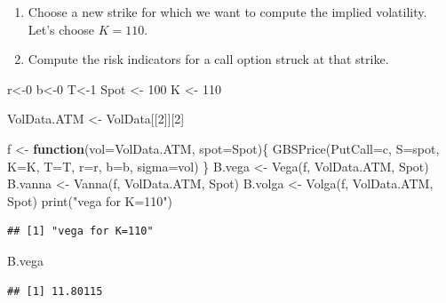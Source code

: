 \documentclass[
]{article}
\newenvironment{Shaded}{\begin{snugshade}}{\end{snugshade}}
\newcommand{\AttributeTok}[1]{\textcolor[rgb]{0.77,0.63,0.00}{#1}}
\newcommand{\ControlFlowTok}[1]{\textcolor[rgb]{0.13,0.29,0.53}{\textbf{#1}}}
\newcommand{\DecValTok}[1]{\textcolor[rgb]{0.00,0.00,0.81}{#1}}
\newcommand{\FunctionTok}[1]{\textcolor[rgb]{0.00,0.00,0.00}{#1}}
\newcommand{\NormalTok}[1]{#1}
\newcommand{\OtherTok}[1]{\textcolor[rgb]{0.56,0.35,0.01}{#1}}
\newcommand{\StringTok}[1]{\textcolor[rgb]{0.31,0.60,0.02}{#1}}
\begin{document}
\begin{enumerate}
\def\labelenumi{\arabic{enumi}.}
\setcounter{enumi}{2}
\item
  Choose a new strike for which we want to compute the implied
  volatility. Let's choose \(K=110\).
\item
  Compute the risk indicators for a call option struck at that strike.
\end{enumerate}

\begin{Shaded}
\begin{Highlighting}[]
\NormalTok{r}\OtherTok{\textless{}{-}}\DecValTok{0}
\NormalTok{b}\OtherTok{\textless{}{-}}\DecValTok{0}
\NormalTok{T}\OtherTok{\textless{}{-}}\DecValTok{1}
\NormalTok{Spot }\OtherTok{\textless{}{-}} \DecValTok{100}
\NormalTok{K }\OtherTok{\textless{}{-}} \DecValTok{110}


\NormalTok{VolData.ATM }\OtherTok{\textless{}{-}}\NormalTok{ VolData[[}\DecValTok{2}\NormalTok{]][}\DecValTok{2}\NormalTok{]}

\NormalTok{f }\OtherTok{\textless{}{-}} \ControlFlowTok{function}\NormalTok{(}\AttributeTok{vol=}\NormalTok{VolData.ATM, }\AttributeTok{spot=}\NormalTok{Spot)\{}
  \FunctionTok{GBSPrice}\NormalTok{(}\AttributeTok{PutCall=}\StringTok{\textquotesingle{}c\textquotesingle{}}\NormalTok{, }\AttributeTok{S=}\NormalTok{spot, }\AttributeTok{K=}\NormalTok{K, }\AttributeTok{T=}\NormalTok{T, }\AttributeTok{r=}\NormalTok{r, }\AttributeTok{b=}\NormalTok{b, }\AttributeTok{sigma=}\NormalTok{vol)}
\NormalTok{\}}
\NormalTok{B.vega }\OtherTok{\textless{}{-}} \FunctionTok{Vega}\NormalTok{(f, VolData.ATM, Spot)}
\NormalTok{B.vanna }\OtherTok{\textless{}{-}} \FunctionTok{Vanna}\NormalTok{(f, VolData.ATM, Spot)}
\NormalTok{B.volga }\OtherTok{\textless{}{-}} \FunctionTok{Volga}\NormalTok{(f, VolData.ATM, Spot)}
\FunctionTok{print}\NormalTok{(}\StringTok{"vega for K=110"}\NormalTok{)}
\end{Highlighting}
\end{Shaded}

\begin{verbatim}
## [1] "vega for K=110"
\end{verbatim}

\begin{Shaded}
\begin{Highlighting}[]
\NormalTok{B.vega}
\end{Highlighting}
\end{Shaded}

\begin{verbatim}
## [1] 11.80115
\end{verbatim}
\end{document}
